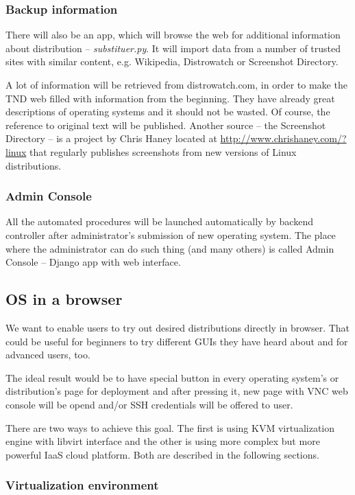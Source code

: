 \documentclass[thesis=B,english]{FITthesis}[2013/04/26]
\begin{document}
\subsubsection{Backup information}

There will also be an app, which will browse the web for additional information about distribution -- \emph{substituer.py}. It will import data from a number of trusted sites with similar content, e.g. Wikipedia, Distrowatch or Screenshot Directory.

A lot of information will be retrieved from distrowatch.com, in order to make the TND web filled with information from the beginning. They have already great descriptions of operating systems and it should not be wasted. Of course, the reference to original text will be published. Another source -- the Screenshot Directory -- is a project by Chris Haney located at \url{http://www.chrishaney.com/?linux} that regularly publishes screenshots from new versions of Linux distributions.

\subsubsection{Admin Console}

All the automated procedures will be launched automatically by backend controller after administrator's submission of new operating system. The place where the administrator can do such thing (and many others) is called Admin Console -- Django app with web interface.

\subsection{OS in a browser}

We want to enable users to try out desired distributions directly in browser. That could be useful for beginners to try different GUIs they have heard about and for advanced users, too.

The ideal result would be to have special button in every operating system's or distribution's page for deployment and after pressing it, new page with VNC web console will be opend and/or SSH credentials will be offered to user.

There are two ways to achieve this goal. The first is using KVM virtualization engine with libvirt interface and the other is using more complex but more powerful IaaS cloud platform. Both are described in the following sections.

\subsubsection{Virtualization environment}
\end{document}
